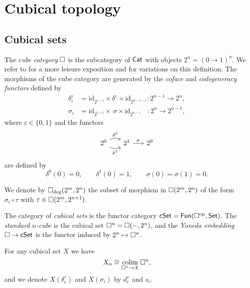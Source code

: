 
\section{Cubical topology} \label{s:cubical}

\subsection{Cubical sets}

The \textit{cube category} $\square$ is the subcategory of $\mathsf{Cat}$ with objects $2^n = (0 \to 1)^n$.
We refer to \cite{grandis2003cubicalsite} for a more leisure exposition and for variations on this definition.
The morphisms of the cube category are generated by the \textit{coface} and \textit{codegeneracy functors} defined by
\begin{align*}
\delta_i^\varepsilon & = \mathrm{id}_{2^{i-1}} \times \delta^\varepsilon \times \mathrm{id}_{2^{n-1-i}} \colon 2^{n-1} \to 2^n, \\
\sigma_i & = \mathrm{id}_{2^{i-1}} \times \, \sigma \times \mathrm{id}_{2^{n-i}} \quad \colon 2^{n} \to 2^{n-1},
\end{align*}
where $\varepsilon \in \{0,1\}$ and the functors
\begin{equation*}
\begin{tikzcd} [column sep=16pt]
2^0 \arrow[r, bend left, "\delta^0"] \arrow[r, bend right, "\delta^1"'] & 2^1 \arrow[r, "\sigma"] & 2^0
\end{tikzcd}
\end{equation*}
are defined by
\begin{equation*}
\delta^0(0) = 0, \qquad \delta^1(0) = 1, \qquad \sigma(0) = \sigma(1) = 0.
\end{equation*}

We denote by $\square_{\deg}(2^m, 2^n)$ the subset of morphism in $\square(2^m, 2^n)$ of the form $\sigma_i \circ \tau$ with $\tau \in \square(2^m, 2^{n+1})$.

The category of \textit{cubical sets} is the functor category $\mathsf{cSet} = \mathsf{Fun}(\square^{\mathrm{op}}, \mathsf{Set})$.
The \textit{standard $n$-cube} is the cubical set $\square^n = \square(-, 2^n)$, and the \textit{Yoneda embedding} $\square \to \mathsf{cSet}$ is the functor induced by $2^n \mapsto \square^n$.

For any cubical set $X$ we have
\begin{equation*}
X_n \cong \operatorname*{colim}_{\square^n \to X} \square^n,
\end{equation*}
and we denote $X(\delta_i^\varepsilon)$ and $X(\sigma_i)$ by $d_i^\varepsilon$ and $s_i$.

